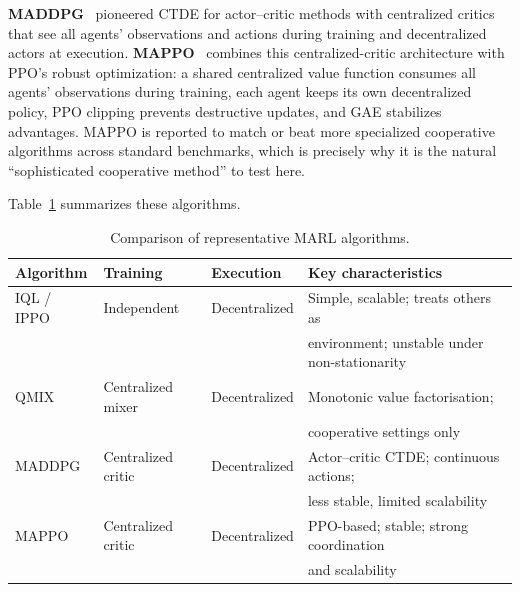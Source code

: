 \textbf{MADDPG}~\cite{lowe2017maddpg} pioneered CTDE for actor--critic methods with
centralized critics that see all agents' observations and actions during training
and decentralized actors at execution. \textbf{MAPPO}~\cite{yu2021mappo} combines
this centralized-critic architecture with PPO's robust optimization: a shared
centralized value function consumes all agents' observations during training, each
agent keeps its own decentralized policy, PPO clipping prevents destructive
updates, and GAE stabilizes advantages. MAPPO is reported to match or beat more
specialized cooperative algorithms across standard benchmarks, which is precisely
why it is the natural ``sophisticated cooperative method'' to test here.

Table~\ref{tab:algos} summarizes these algorithms.

\begin{table}[H]
\centering
\caption{Comparison of representative MARL algorithms.}
\label{tab:algos}
\small
\begin{tabular}{@{}llll@{}}
\toprule
\textbf{Algorithm} & \textbf{Training} & \textbf{Execution} & \textbf{Key characteristics} \\
\midrule
IQL / IPPO & Independent       & Decentralized & Simple, scalable; treats others as \\
           &                   &               & environment; unstable under non-stationarity \\[0.3em]
QMIX       & Centralized mixer & Decentralized & Monotonic value factorisation; \\
           &                   &               & cooperative settings only \\[0.3em]
MADDPG     & Centralized critic& Decentralized & Actor--critic CTDE; continuous actions; \\
           &                   &               & less stable, limited scalability \\[0.3em]
MAPPO      & Centralized critic& Decentralized & PPO-based; stable; strong coordination \\
           &                   &               & and scalability \\
\bottomrule
\end{tabular}
\end{table}

